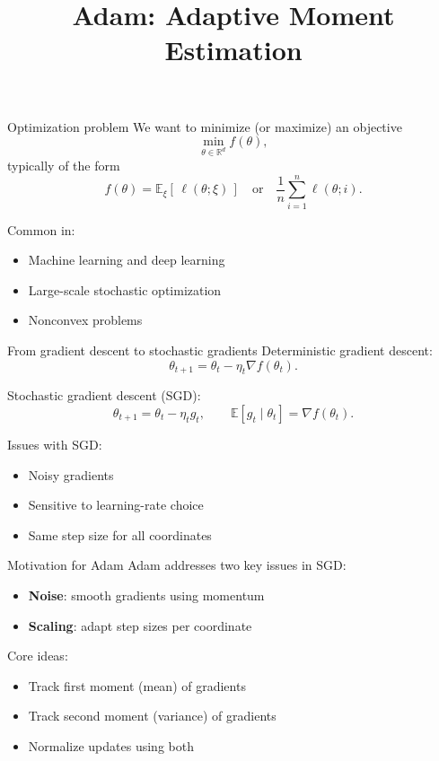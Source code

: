 \documentclass[compress]{beamer}
\title['26 MA 551]{ Adam: Adaptive Moment Estimation}
\author{}
\date{}
\begin{document}
\begin{frame}
\titlepage
\end{frame}

\begin{frame}{Optimization problem}
We want to minimize (or maximize) an objective
\[
\min_{\theta \in \mathbb{R}^d} f(\theta),
\]
typically of the form
\[
f(\theta) = \mathbb{E}_{\xi}[\,\ell(\theta;\xi)\,]
\quad \text{or} \quad
\frac{1}{n}\sum_{i=1}^n \ell(\theta;i).
\]

Common in:
\begin{itemize}
\item Machine learning and deep learning
\item Large-scale stochastic optimization
\item Nonconvex problems
\end{itemize}
\end{frame}

\begin{frame}{From gradient descent to stochastic gradients}
Deterministic gradient descent:
\[
\theta_{t+1} = \theta_t - \eta_t \nabla f(\theta_t).
\]

Stochastic gradient descent (SGD):
\[
\theta_{t+1} = \theta_t - \eta_t g_t,
\qquad
\mathbb{E}[g_t \mid \theta_t] = \nabla f(\theta_t).
\]

Issues with SGD:
\begin{itemize}
\item Noisy gradients
\item Sensitive to learning-rate choice
\item Same step size for all coordinates
\end{itemize}
\end{frame}

\begin{frame}{Motivation for Adam}
Adam addresses two key issues in SGD:
\begin{itemize}
\item \textbf{Noise}: smooth gradients using momentum
\item \textbf{Scaling}: adapt step sizes per coordinate
\end{itemize}

Core ideas:
\begin{itemize}
\item Track first moment (mean) of gradients
\item Track second moment (variance) of gradients
\item Normalize updates using both
\end{itemize}
\end{frame}
\end{document}

